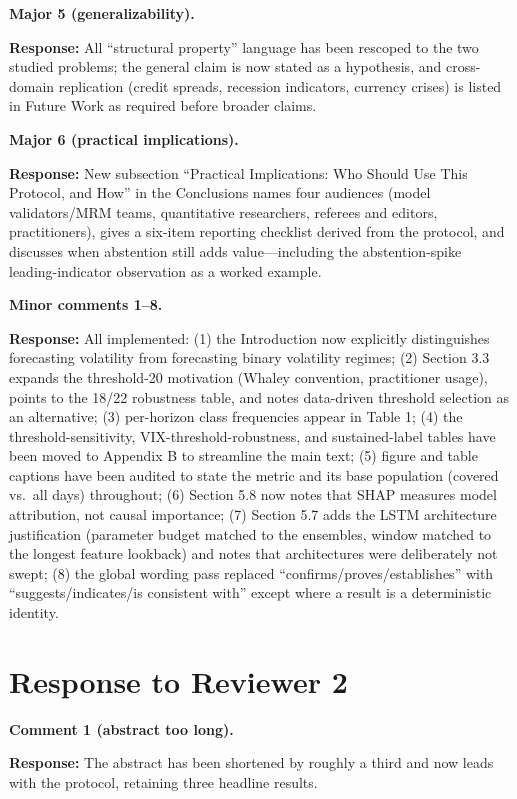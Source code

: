 \documentclass[11pt]{article}
\newcommand{\response}{\textbf{Response:} }
\begin{document}
\textbf{Major 5 (generalizability).}

\response All ``structural property'' language has been rescoped to the two studied problems;
the general claim is now stated as a hypothesis, and cross-domain replication (credit spreads,
recession indicators, currency crises) is listed in Future Work as required before broader
claims.

\textbf{Major 6 (practical implications).}

\response New subsection ``Practical Implications: Who Should Use This Protocol, and How'' in
the Conclusions names four audiences (model validators/MRM teams, quantitative researchers,
referees and editors, practitioners), gives a six-item reporting checklist derived from the
protocol, and discusses when abstention still adds value---including the abstention-spike
leading-indicator observation as a worked example.

\textbf{Minor comments 1--8.}

\response All implemented: (1) the Introduction now explicitly distinguishes forecasting
volatility from forecasting binary volatility regimes; (2) Section 3.3 expands the
threshold-20 motivation (Whaley convention, practitioner usage), points to the 18/22
robustness table, and notes data-driven threshold selection as an alternative; (3) per-horizon
class frequencies appear in Table 1; (4) the threshold-sensitivity, VIX-threshold-robustness,
and sustained-label tables have been moved to Appendix B to streamline the main text; (5)
figure and table captions have been audited to state the metric and its base population
(covered vs.\ all days) throughout; (6) Section 5.8 now notes that SHAP measures model
attribution, not causal importance; (7) Section 5.7 adds the LSTM architecture justification
(parameter budget matched to the ensembles, window matched to the longest feature lookback)
and notes that architectures were deliberately not swept; (8) the global wording pass replaced
``confirms/proves/establishes'' with ``suggests/indicates/is consistent with'' except where a
result is a deterministic identity.

\section*{Response to Reviewer 2}

\textbf{Comment 1 (abstract too long).}

\response The abstract has been shortened by roughly a third and now leads with the protocol,
retaining three headline results.
\end{document}
